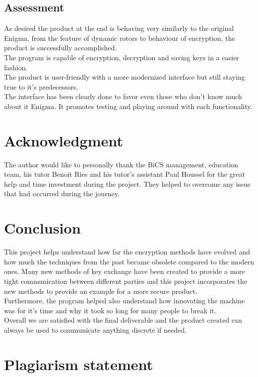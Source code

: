 \documentclass[conference,compsoc]{IEEEtran}
\begin{document}
\subsection{Assessment}
As desired the product at the end is behaving very similarly to the original Enigma, from the feature of dynamic rotors to behaviour of encryption, the product is successfully accomplished.\\
The program is capable of encryption, decryption and saving keys in a easier fashion.\\
The product is user-friendly with a more modernized interface but still staying true to it's predecessors.\\
The interface has been clearly done to favor even those who don't know much about it Enigma. It promotes testing and playing around with each functionality.\\


\section*{Acknowledgment}
The author would like to personally thank the BiCS management, education team, his tutor Benoit Ries and his tutor's assistant Paul Houssel for the great help and time investment during the project. They helped to overcome any issue that had occurred during the journey.


\section{Conclusion}

This project helps understand how far the encryption methods have evolved and how much the techniques from the past became obsolete compared to the modern ones. Many new methods of key exchange have been created to provide a more tight communication between different parties and this project incorporates the new methods to provide an example for a more secure product.\\   
Furthermore, the program helped also understand how innovating the machine was for it's time and why it took so long for many people to break it.\\
Overall we are satisfied with the final deliverable and the product created can always be used to communicate anything discrete if needed.\\

\section{Plagiarism statement}
\end{document}
